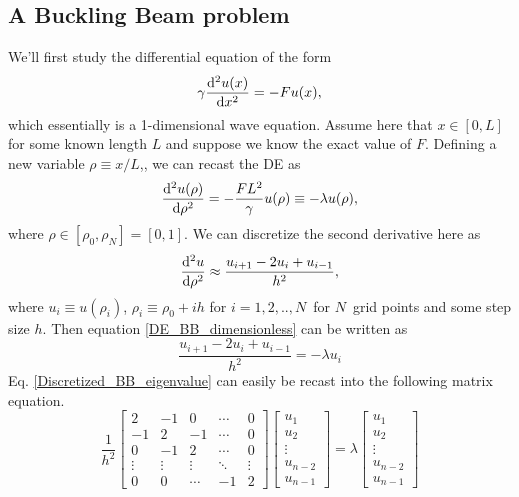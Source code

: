 \documentclass[english,notitlepage,reprint]{revtex4-1}  %
\begin{document}
\subsection{A Buckling Beam problem}
We'll first study the differential equation of the form 
\begin{equation}
	\gamma \dv[2]{u(x)}{x} = -Fu(x),
\end{equation}
which essentially is a 1-dimensional wave equation. Assume here that $ x\in [0,L]$ for some known length $L$ and suppose we know the exact value of $F$. Defining a new variable $\rho \equiv x/L$,, we can recast the DE as
\begin{equation}\label{DE_BB_dimensionless}
	\dv[2]{u(\rho)}{\rho} = -\frac{FL^2}{\gamma}u(\rho) \equiv -\lambda u(\rho),
\end{equation}
where $\rho \in [\rho_0, \rho_N] = [0,1]$. We can discretize the second derivative here as 
\begin{equation}
	\dv[2]{u}{\rho} \approx \frac{u_{i+1} - 2u_i + u_{i-1}}{h^2},
\end{equation}
where $u_i \equiv u(\rho_i)$, $\rho_i \equiv \rho_0 + ih$ for $i=1,2,..,N$ for $N$ grid points and some step size $h$. Then equation \eqref{DE_BB_dimensionless} can be written as 
\begin{equation}\label{Discretized_BB_eigenvalue}
	\frac{u_{i+1} - 2u_i + u_{i-1}}{h^2} = - \lambda u_i
\end{equation}
Eq. \eqref{Discretized_BB_eigenvalue} can easily be recast into the following matrix equation.
\begin{equation}\label{matrix_eq_1}
\frac{1}{h^2}
\begin{bmatrix}
2 & -1 & 0 & \cdots & 0 \\
-1 & 2 & -1 & \cdots& 0  \\
0 & -1 & 2 & \cdots & 0\\
\vdots & \vdots & \vdots & \ddots & \vdots \\
0 & 0 & \cdots & -1 & 2
\end{bmatrix}
\begin{bmatrix}
u_1 \\ u_2 \\ \vdots \\ u_{n-2} \\ u_{n-1}
\end{bmatrix}
 = \lambda 
 \begin{bmatrix}
 u_1 \\ u_2 \\ \vdots \\ u_{n-2} \\ u_{n-1}
 \end{bmatrix}
\end{equation}
\end{document}
